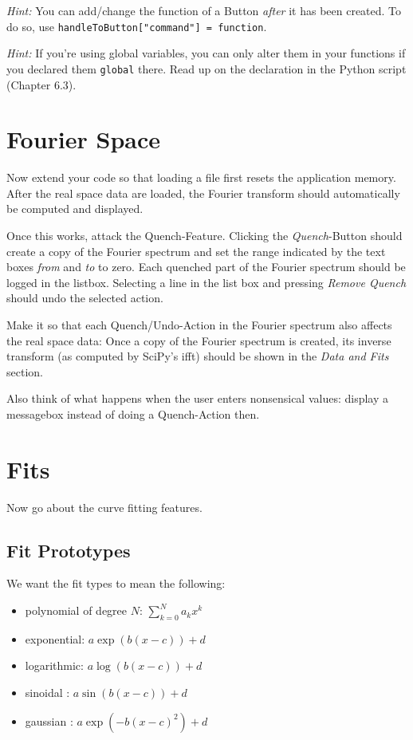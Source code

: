 \documentclass[
	english,
	fontsize=10pt,
	parskip=half,
	titlepage=true,
	DIV=12
]{scrartcl}
\newcommand*{\inPy}[1]{\texttt{#1}}
\begin{document}
\emph{Hint:} You can add/change the function of a Button \emph{after} it has been created. To do so, use \texttt{handleToButton["command"] = function}.

\emph{Hint:} If you're using global variables, you can only alter them in your functions if you declared them \inPy{global} there. Read up on the declaration in the Python script (Chapter 6.3).

\section{Fourier Space}
Now extend your code so that loading a file first resets the application memory. After the real space data are loaded, the Fourier transform should automatically be computed and displayed.

Once this works, attack the Quench-Feature. Clicking the \emph{Quench}-Button should create a copy of the Fourier spectrum and set the range indicated by the text boxes \emph{from} and \emph{to} to zero. Each quenched part of the Fourier spectrum should be logged in the listbox. Selecting a line in the list box and pressing \emph{Remove Quench} should undo the selected action.

Make it so that each Quench/Undo-Action in the Fourier spectrum also affects the real space data: Once a copy of the Fourier spectrum is created, its inverse transform (as computed by SciPy's ifft) should be shown in the \emph{Data and Fits} section.

Also think of what happens when the user enters nonsensical values: display a messagebox instead of doing a Quench-Action then.

\section{Fits}
Now go about the curve fitting features. 

\subsection{Fit Prototypes}
We want the fit types to mean the following:
\begin{itemize}
\item polynomial of degree $N$: $\sum_{k=0}^N a_k x^k$
\item exponential: $a \exp( b(x - c)) + d$
\item logarithmic: $a \log( b(x - c)) + d$
\item sinoidal   : $a \sin( b(x - c)) + d$
\item gaussian   : $a \exp(-b(x - c)^2) + d$
\end{itemize}
\end{document}
